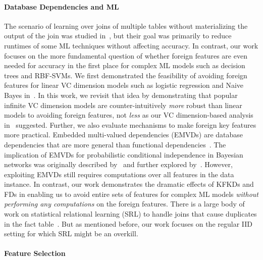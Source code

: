 \documentclass[sigconf]{acmart}
\begin{document}
\paragraph*{Database Dependencies and ML}
The scenario of learning over joins of multiple tables without materializing the output of the join was studied in~\cite{orion,olteanuf,rendle,santoku},
but their goal was primarily to reduce runtimes of some ML techniques without affecting accuracy.
In contrast, our work focuses on the more fundamental question of whether foreign features are even needed for accuracy in the first place for complex ML models
such as decision trees and RBF-SVMs.
We first demonstrated the feasibility of avoiding foreign features for linear VC dimension models such as logistic regression and Naive Bayes in~\cite{hamlet}.
In this work, we revisit that idea by demonstrating that popular infinite VC dimension models are counter-intuitively \textit{more} robust than linear models to avoiding 
foreign features, not \textit{less} as our VC dimension-based analysis in~\cite{hamlet} suggested. Further, we also evaluate mechanisms to make foreign key features more practical.
Embedded multi-valued dependencies (EMVDs) are database dependencies that are more general than functional dependencies~\cite{dbtheorybook}. 
The implication of EMVDs for probabilistic conditional independence in Bayesian networks was originally described by~\cite{pearl} and further explored by~\cite{wong}.
However, exploiting EMVDs still requires computations over all features in the data instance. In contrast, our work demonstrates the dramatic effects of KFKDs and FDs 
in enabling us to avoid entire sets of features for complex ML models \textit{without performing any computations} on the foreign features.
There is a large body of work on statistical relational learning (SRL) to handle joins that cause duplicates in the fact table~\cite{srlbook}. But as mentioned before, 
our work focuses on the regular IID setting for which SRL might be an overkill.


\paragraph*{Feature Selection}
\end{document}
